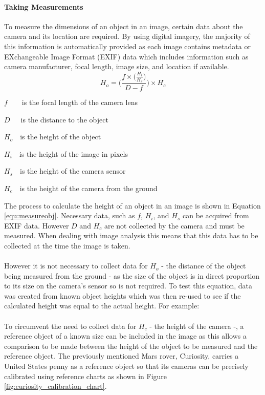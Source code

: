 	\paragraph{Taking Measurements}\label{sec:taking_measurements}
		To measure the dimensions of an object in an image, certain data about the camera and its location are required. By using digital imagery, the majority of this information is automatically provided as each image contains metadata or EXchangeable Image Format (EXIF) data which includes information such as camera manufacturer, focal length, image size, and location if available.
	\begin{equation}
		\label{equ:measureobj}
		H_{o} = \Bigg(\frac{f\times\big(\frac{H_{i}}{H_{s}}\big)}{D - f}\Bigg)\times H_{c}
	\end{equation}
	\begin{where}
		\item $f$~~~~is the focal length of the camera lens
		\item $D$~~~is the distance to the object
		\item $H_{o}$~~is the height of the object
		\item $H_{i}$~~is the height of the image in pixels
		\item $H_{s}$~~is the height of the camera sensor
		\item $H_{c}$~~is the height of the camera from the ground
	\end{where}
	\vspace{5mm}
	The process to calculate the height of an object in an image is shown in Equation \ref{equ:measureobj}. Necessary data, such as $f$, $H_i$, and $H_s$ can be acquired from EXIF data. However $D$ and $H_c$ are not collected by the camera and must be measured. When dealing with image analysis this means that this data has to be collected at the time the image is taken.
	\\\\
	However it is not necessary to collect data for $H_o$ - the distance of the object being measured from the ground - as the size of the object is in direct proportion to its size on the camera’s sensor so is not required. To test this equation, data was created from known object heights which was then re-used to see if the calculated height was equal to the actual height. For example:
	\\\\
	To circumvent the need to collect data for $H_c$ - the height of the camera -, a reference object of a known size can be included in the image as this allows a comparison to be made between the height of the object to be measured and the reference object. The previously mentioned Mars rover, Curiosity, carries a United States penny as a reference object so that its cameras can be precisely calibrated using reference charts as shown in Figure \ref{fig:curiosity_calibration_chart}.
